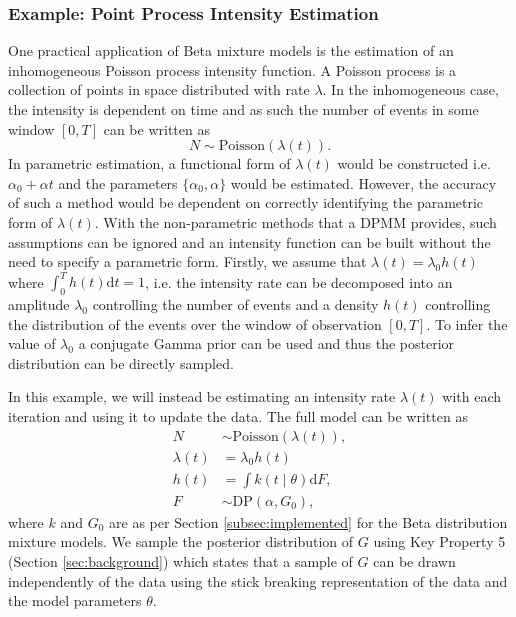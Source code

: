\documentclass[nojss]{jss}
\begin{document}
\subsubsection{Example: Point Process Intensity Estimation}
One practical application of Beta mixture models is the estimation of an inhomogeneous Poisson process intensity function. A Poisson process is a collection of points in space distributed with rate $\lambda$. In the inhomogeneous case, the intensity is dependent on time and as such the number of events in some window $\left[0 , T\right]$ can be written as
\begin{equation}
N \sim \text{Poisson} (\lambda (t) ).
\end{equation}
In parametric estimation, a functional form of $\lambda (t)$ would be constructed i.e. $\alpha _0 + \alpha t$ and the parameters $\{\alpha _0, \alpha \}$ would be estimated. However, the accuracy of such a method would be dependent on correctly identifying the parametric form of $\lambda (t)$. With the non-parametric methods that a DPMM provides, such assumptions can be ignored and an intensity function can be built without the need to specify a parametric form. Firstly, we assume that $\lambda (t) = \lambda _0 h(t)$ where $\int _0 ^T h(t) \mathrm{d} t = 1$, i.e. the intensity rate can be decomposed into an amplitude $\lambda _0$ controlling the number of events and a density $h(t)$ controlling the distribution of the events over the window of observation $\left[0 , T\right]$. To infer the value of $\lambda _0$ a conjugate Gamma prior can be used and thus the posterior distribution can be directly sampled.

In this example, we will instead be estimating an intensity rate $\lambda (t)$ with each iteration and using it to update the data. The full model can be written as
\begin{align*}
N & \sim \text{Poisson} ( \lambda (t) ), \\
\lambda (t) & = \lambda _0 h(t) \\
h (t) & = \int k(t \mid \theta) \mathrm{d}F, \\
F & \sim \text{DP} (\alpha , G_0),
\end{align*}
where $k$ and $G_0$ are as per Section \ref{subsec:implemented} for the Beta distribution mixture models. We sample the posterior distribution of $G$ using Key Property 5 (Section \ref{sec:background}) which states that a sample of $G$ can be drawn independently of the data using the stick breaking representation of the data and the model parameters $\theta$.
\end{document}
